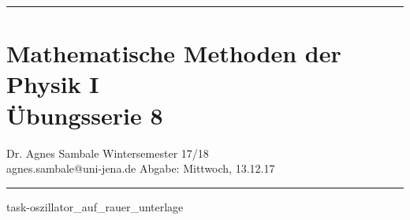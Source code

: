 \documentclass[a4paper,fleqn, 10pt]{article}
\begin{document}
	\pagestyle{empty}

	\hrule
	\section*{\centering Mathematische Methoden der Physik I \\ Übungsserie 8}
	\medskip
	Dr. Agnes Sambale \hfill Wintersemester 17/18\\
	agnes.sambale@uni-jena.de \hfill Abgabe: Mittwoch, 13.12.17
	\bigskip
	\hrule
	\bigskip
	\bigskip

	\atiShowSolutionsfalse

	
	\bigskip
	
	\newpage
	{task-oszillator_auf_rauer_unterlage}





\end{document}
